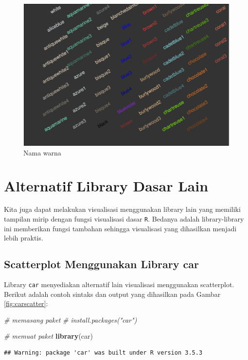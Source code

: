\documentclass[]{book}
\newenvironment{Shaded}{\begin{snugshade}}{\end{snugshade}}
\newcommand{\KeywordTok}[1]{\textcolor[rgb]{0.13,0.29,0.53}{\textbf{#1}}}
\newcommand{\CommentTok}[1]{\textcolor[rgb]{0.56,0.35,0.01}{\textit{#1}}}
\newcommand{\NormalTok}[1]{#1}
\begin{document}
\begin{figure}

{\centering \includegraphics[width=0.7\linewidth]{EnvStat_files/figure-latex/color-1} 

}

\caption{Nama warna}\label{fig:color}
\end{figure}

\section{Alternatif Library Dasar
Lain}\label{alternatif-library-dasar-lain}

Kita juga dapat melakukan visualisasi menggunakan library lain yang
memiliki tampilan mirip dengan fungsi visualisasi dasar \texttt{R}.
Bedanya adalah library-library ini memberikan fungsi tambahan sehingga
visualisasi yang dihasilkan menjadi lebih praktis.

\subsection{Scatterplot Menggunakan Library
car}\label{scatterplot-menggunakan-library-car}

Library \texttt{car} menyediakan alternatif lain visualisasi menggunakan
scatterplot. Berikut adalah contoh sintaks dan output yang dihasilkan
pada Gambar \ref{fig:carscatter}:

\begin{Shaded}
\begin{Highlighting}[]
\CommentTok{# memasang paket}
\CommentTok{# install.packages("car")}

\CommentTok{# memuat paket}
\KeywordTok{library}\NormalTok{(car)}
\end{Highlighting}
\end{Shaded}

\begin{verbatim}
## Warning: package 'car' was built under R version 3.5.3
\end{verbatim}
\end{document}
